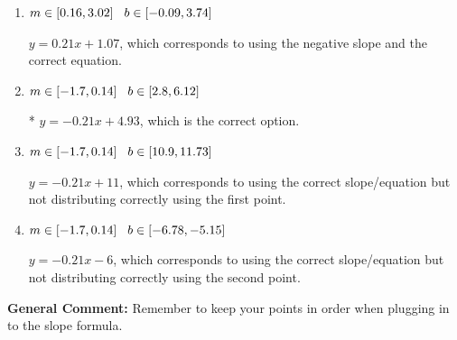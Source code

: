\documentclass{extbook}[14pt]
\begin{document}
\begin{enumerate}
{\begin{enumerate}[label=\Alph*.]
 $y = -0.21x -4.93$, which corresponds to using the correct slope and getting the negative y-intercept.
\item \( m \in [0.16, 3.02] \hspace*{3mm} b \in [-0.09, 3.74] \)

 $y = 0.21x + 1.07$, which corresponds to using the negative slope and the correct equation.
\item \( m \in [-1.7, 0.14] \hspace*{3mm} b \in [2.8, 6.12] \)

* $y = -0.21x + 4.93$, which is the correct option.
\item \( m \in [-1.7, 0.14] \hspace*{3mm} b \in [10.9, 11.73] \)

 $y = -0.21x + 11$, which corresponds to using the correct slope/equation but not distributing correctly using the first point.
\item \( m \in [-1.7, 0.14] \hspace*{3mm} b \in [-6.78, -5.15] \)

 $y = -0.21x -6$, which corresponds to using the correct slope/equation but not distributing correctly using the second point.
\end{enumerate}

\textbf{General Comment:} Remember to keep your points in order when plugging in to the slope formula.
}
\end{enumerate}
\end{document}
